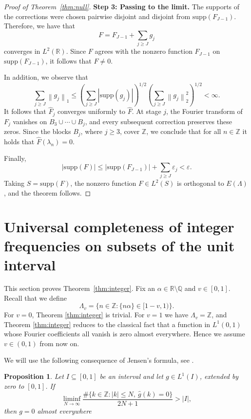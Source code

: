 \documentclass[reqno,a4paper,12pt]{amsart}
\numberwithin{equation}{section}
\newtheorem{proposition}[definition]{Proposition}
\def\Z{{\mathbb Z}}
\def\R{{\mathbb R}}
\def\Q{{\mathbb Q}}
\newcommand{\supp}{{\mathrm{supp}}}
\newcommand\1{\mathds{1}}
\newcommand{\norm}[1]{\left\lVert #1 \right\rVert}
\begin{document}
\begin{proof}[Proof of Theorem~\ref{thm:null}]
\medskip
\noindent\textbf{Step 3: Passing to the limit.}
The supports of the corrections were chosen pairwise disjoint and
disjoint from \(\supp (F_{J-1})\). Therefore, we have that
\[
    F=F_{J-1}+\sum_{j\geq J}g_j
\]
converges in \(L^2(\R)\). Since \(F\) agrees with
the nonzero function \(F_{J-1}\) on \(\supp (F_{J-1})\), it follows that $F \neq 0$.

In addition, we observe that
\[
    \sum_{j\geq J}\norm{g_j}_1
    \leq
    \left(\sum_{j\geq J}|\supp (g_j)|\right)^{1/2}
    \left(\sum_{j\geq J}\norm{g_j}_2^2\right)^{1/2}
    <\infty.
\]
It follows that \(\widehat F_j\) converges uniformly to \(\widehat F\).
At stage \(j\), the Fourier transform of \(F_j\) vanishes on
\(B_3\cup\cdots\cup B_j\), and every subsequent correction preserves
these zeros. Since the blocks \(B_j\), where \(j\geq3\), cover \(\Z\), we
conclude that for all $n \in \Z$ it holds that $\widehat F(\lambda_n)=0$.

Finally,
\[
    |\supp (F)|
    \leq
    |\supp (F_{J-1})|+\sum_{j\geq J}\varepsilon_j
    <\varepsilon.
\]
Taking \(S=\supp (F)\), the nonzero function \(F\in L^2(S)\) is
orthogonal to \(E(\Lambda)\), and the theorem follows.
\end{proof}


\section{Universal completeness of integer frequencies on subsets of the unit interval}\label{sec:integer}
This section proves Theorem~\ref{thm:integer}. Fix an $\alpha\in\R\setminus\Q$ and $v\in[0,1]$. Recall that we define
\begin{equation}\label{eq:construction}
 \Lambda_v=\{n\in\Z:\{n\alpha\}\in[1-v,1)\} .
\end{equation}
For $v=0$, Theorem \ref{thm:integer} is trivial. For $v=1$ we have $\Lambda_v=\Z$, and
Theorem \ref{thm:integer} reduces to the classical fact that a function in $L^1(0,1)$ whose
Fourier coefficients all vanish is zero almost everywhere.  Hence we
assume $v\in(0,1)$ from now on.

We will use the following consequence of Jensen's formula, see
\cite[Lectures~2-3]{Levin1996}.

\begin{proposition}\label{prop:zero-density}
    Let $I\subseteq[0,1]$ be an interval and let $g\in L^1(I)$, extended by
zero to $[0,1]$.  If
\[
 \liminf_{N\to\infty}
 \frac{\#\{k\in\Z:|k|\leq N,\ \widehat g(k)=0\}}{2N+1}>|I|,
\]
then $g=0$ almost everywhere
\end{proposition}
\end{document}
